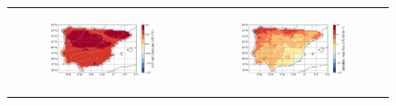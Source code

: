 \begin{figure}[htbp]
\begin{tabular}{cc}
        \begin{subfigure}[b]{0.5\textwidth}
            \caption{}
            \includegraphics[width=\textwidth]{images/chap4/future/diffmap_t2m_presfut.png}
        \end{subfigure} &
        \begin{subfigure}[b]{0.5\textwidth}
            \caption{}
            \includegraphics[width=\textwidth]{images/chap4/future/diffmap_fluxsens_presfut.png}
        \end{subfigure} \\


\end{tabular}
\end{figure}
